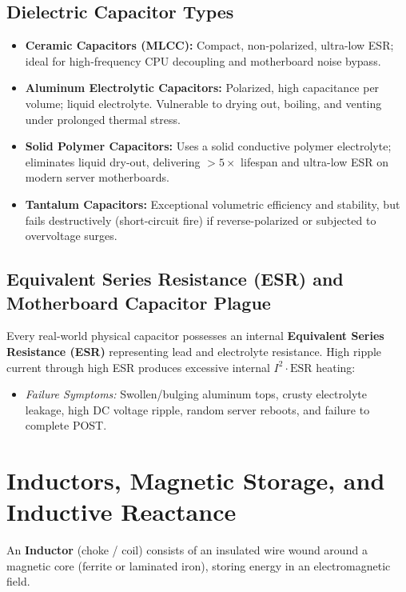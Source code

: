 \subsection{Dielectric Capacitor Types}
\begin{itemize}
    \item \textbf{Ceramic Capacitors (MLCC):} Compact, non-polarized, ultra-low ESR; ideal for high-frequency CPU decoupling and motherboard noise bypass.
    \item \textbf{Aluminum Electrolytic Capacitors:} Polarized, high capacitance per volume; liquid electrolyte. Vulnerable to drying out, boiling, and venting under prolonged thermal stress.
    \item \textbf{Solid Polymer Capacitors:} Uses a solid conductive polymer electrolyte; eliminates liquid dry-out, delivering $>5\times$ lifespan and ultra-low ESR on modern server motherboards.
    \item \textbf{Tantalum Capacitors:} Exceptional volumetric efficiency and stability, but fails destructively (short-circuit fire) if reverse-polarized or subjected to overvoltage surges.
\end{itemize}

\subsection{Equivalent Series Resistance (ESR) and Motherboard Capacitor Plague}
Every real-world physical capacitor possesses an internal \textbf{Equivalent Series Resistance (ESR)} representing lead and electrolyte resistance. High ripple current through high ESR produces excessive internal $I^2 \cdot \text{ESR}$ heating:
\begin{itemize}
    \item \textit{Failure Symptoms:} Swollen/bulging aluminum tops, crusty electrolyte leakage, high DC voltage ripple, random server reboots, and failure to complete POST.
\end{itemize}


\section{Inductors, Magnetic Storage, and Inductive Reactance}
\label{sec:inductors}

An \textbf{Inductor} (choke / coil) consists of an insulated wire wound around a magnetic core (ferrite or laminated iron), storing energy in an electromagnetic field.

